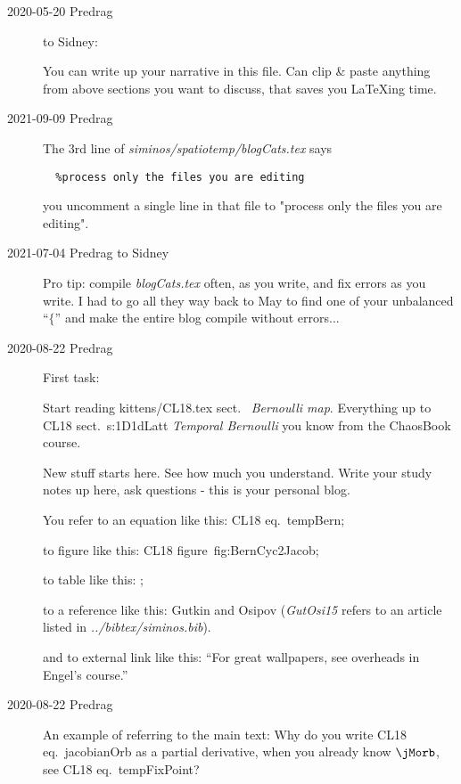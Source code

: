 \begin{description}

\item[2020-05-20 Predrag] to Sidney:

You can write up your narrative in this file.
Can clip \& paste anything from above sections you
want to discuss, that saves you LaTeXing time.

\item[2021-09-09 Predrag]
The 3rd line of  \emph{siminos/spatiotemp/blogCats.tex}
says
\begin{verbatim}
  %process only the files you are editing
\end{verbatim}
you uncomment a single line in that file to "process  only the files you
are editing".

\item[2021-07-04 Predrag to Sidney]
Pro tip: compile \emph{blogCats.tex} often, as you write, and fix errors as
you write. I had to go all they way back to May to find one of your
unbalanced ``$\{$'' and make the entire blog compile without errors...

\item[2020-08-22 Predrag]
First task:

Start reading kittens/CL18.tex sect.~%
{\em Bernoulli map}.
Everything up to CL18 sect.~{s:1D1dLatt}
{\em Temporal Bernoulli}
you know from the ChaosBook course.

New stuff starts here. See how much you understand. Write your
study notes up here, ask questions - this is your personal blog.

You refer to an equation like this: CL18 eq.~{tempBern};

to figure like
this: CL18 figure~{fig:BernCyc2Jacob};

to table like this:
;

to a reference like this: Gutkin and Osipov (\emph{GutOsi15}
refers to an article listed in \emph{../bibtex/siminos.bib}).

and to external link like this:
``For great wallpapers, see overheads in
{Engel's} course.''

\item[2020-08-22 Predrag] An example of referring to the main text:
Why do you write \emph{\jacobianOrb}
CL18 eq.~{jacobianOrb} as a partial derivative, when you already
know $\jMorb$, see CL18 eq.~{tempFixPoint}?


\end{description}
